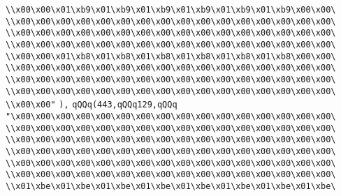 \verb|\\x00\x00\x01\xb9\x01\xb9\x01\xb9\x01\xb9\x01\xb9\x01\xb9\x00\x00\|\newline
\verb|\\x00\x00\x00\x00\x00\x00\x00\x00\x00\x00\x00\x00\x00\x00\x00\x00\|\newline
\verb|\\x00\x00\x00\x00\x00\x00\x00\x00\x00\x00\x00\x00\x00\x00\x00\x00\|\newline
\verb|\\x00\x00\x00\x00\x00\x00\x00\x00\x00\x00\x00\x00\x00\x00\x00\x00\|\newline
\verb|\\x00\x00\x01\xb8\x01\xb8\x01\xb8\x01\xb8\x01\xb8\x01\xb8\x00\x00\|\newline
\verb|\\x00\x00\x00\x00\x00\x00\x00\x00\x00\x00\x00\x00\x00\x00\x00\x00\|\newline
\verb|\\x00\x00\x00\x00\x00\x00\x00\x00\x00\x00\x00\x00\x00\x00\x00\x00\|\newline
\verb|\\x00\x00\x00\x00\x00\x00\x00\x00\x00\x00\x00\x00\x00\x00\x00\x00\|\newline
\verb|\\x00\x00"|\newline
\verb|),|\newline
\verb|qQQq(443,qQQq129,qQQq|\newline
\verb|"\x00\x00\x00\x00\x00\x00\x00\x00\x00\x00\x00\x00\x00\x00\x00\x00\|\newline
\verb|\\x00\x00\x00\x00\x00\x00\x00\x00\x00\x00\x00\x00\x00\x00\x00\x00\|\newline
\verb|\\x00\x00\x00\x00\x00\x00\x00\x00\x00\x00\x00\x00\x00\x00\x00\x00\|\newline
\verb|\\x00\x00\x00\x00\x00\x00\x00\x00\x00\x00\x00\x00\x00\x00\x00\x00\|\newline
\verb|\\x00\x00\x00\x00\x00\x00\x00\x00\x00\x00\x00\x00\x00\x00\x00\x00\|\newline
\verb|\\x00\x00\x00\x00\x00\x00\x00\x00\x00\x00\x00\x00\x00\x00\x00\x00\|\newline
\verb|\\x01\xbe\x01\xbe\x01\xbe\x01\xbe\x01\xbe\x01\xbe\x01\xbe\x01\xbe\|\newline
